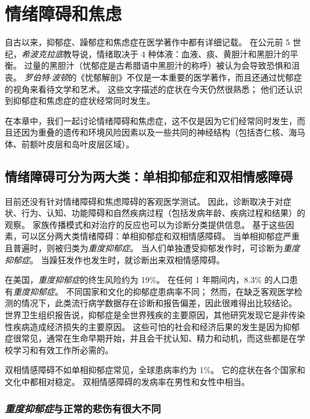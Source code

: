 \chapter{情绪障碍和焦虑} \label{chap:chap61}

自古以来，抑郁症、躁郁症和焦虑症在医学著作中都有详细记载。 
在公元前 5 世纪，\textit{希波克拉底}教导说，情绪取决于 4 种体液：血液、痰、黄胆汁和黑胆汁的平衡。
过量的黑胆汁（忧郁症是古希腊语中黑胆汁的称呼）被认为会导致恐惧和沮丧。
\textit{罗伯特$\cdot$波顿}的《忧郁解剖》不仅是一本重要的医学著作，而且还通过忧郁症的视角来看待文学和艺术。
这些文字描述的症状在今天仍然很熟悉；
他们还认识到抑郁症和焦虑症的症状经常同时发生。


在本章中，我们一起讨论情绪障碍和焦虑症，这不仅是因为它们经常同时发生，而且还因为重叠的遗传和环境风险因素以及一些共同的神经结构（包括杏仁核、海马体、前额叶皮层和岛叶皮层区域）。



\section{情绪障碍可分为两大类：单相抑郁症和双相情感障碍}

目前还没有针对情绪障碍和焦虑障碍的客观医学测试。
因此，诊断取决于对症状、行为、认知、功能障碍和自然疾病过程（包括发病年龄、疾病过程和结果）的观察。
家族传播模式和对治疗的反应也可以为诊断分类提供信息。
基于这些因素，可以区分两大类情绪障碍：单相抑郁症和双相情感障碍。
当单相抑郁症严重且普遍时，则被归类为\textit{重度抑郁症}。
当人们单独遭受抑郁发作时，可诊断为\textit{重度抑郁症}。
当躁狂发作也发生时，就诊断出来双相情感障碍。


在美国，\textit{重度抑郁症}的终生风险约为 19\%。
在任何 1 年期间内，8.3\% 的人口患有\textit{重度抑郁症}。
不同国家和文化的抑郁症患病率不同；
然而，在缺乏客观医学检测的情况下，此类流行病学数据存在诊断和报告偏差，因此很难得出比较结论。
世界卫生组织报告说，抑郁症是全世界残疾的主要原因，其他研究发现它是非传染性疾病造成经济损失的主要原因。
这些可怕的社会和经济后果的发生是因为抑郁症很常见，通常在生命早期开始，并且会干扰认知、精力和动机，而这些都是在学校学习和有效工作所必需的。


双相情感障碍不如单相抑郁症常见，全球患病率约为 1\%。
它的症状在各个国家和文化中都相对稳定。
双相情感障碍的发病率在男性和女性中相当。



\subsection{\textit{重度抑郁症}与正常的悲伤有很大不同}

